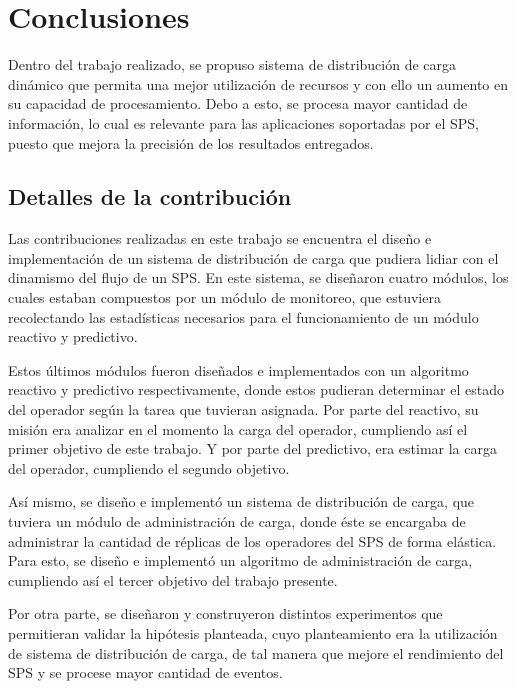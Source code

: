 \chapter{Conclusiones}
\label{cap:conclusiones}
Dentro del trabajo realizado, se propuso sistema de distribución de carga dinámico que permita una mejor utilización de recursos y con ello un aumento en su capacidad de procesamiento. Debo a esto, se procesa mayor cantidad de información, lo cual es relevante para las aplicaciones soportadas por el SPS, puesto que mejora la precisión de los resultados entregados.

\section{Detalles de la contribución}
Las contribuciones realizadas en este trabajo se encuentra el diseño e implementación de un sistema de distribución de carga que pudiera lidiar con el dinamismo del flujo de un SPS. En este sistema, se diseñaron cuatro módulos, los cuales estaban compuestos por un módulo de monitoreo, que estuviera recolectando las estadísticas necesarios para el funcionamiento de un módulo reactivo y predictivo.

Estos últimos módulos fueron diseñados e implementados con un algoritmo reactivo y predictivo respectivamente, donde estos pudieran determinar el estado del operador según la tarea que tuvieran asignada. Por parte del reactivo, su misión era analizar en el momento la carga del operador, cumpliendo así el primer objetivo de este trabajo. Y por parte del predictivo, era estimar la carga del operador, cumpliendo el segundo objetivo.

Así mismo, se diseño e implementó un sistema de distribución de carga, que tuviera un módulo de administración de carga, donde éste se encargaba de administrar la cantidad de réplicas de los operadores del SPS de forma elástica. Para esto, se diseño e implementó un algoritmo de administración de carga, cumpliendo así el tercer objetivo del trabajo presente.

Por otra parte, se diseñaron y construyeron distintos experimentos que permitieran validar la hipótesis planteada, cuyo planteamiento era la utilización de sistema de distribución de carga, de tal manera que mejore el rendimiento del SPS y se procese mayor cantidad de eventos.

